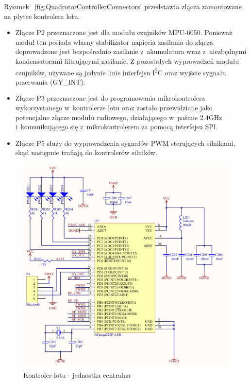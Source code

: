 \documentclass[11pt, twoside]{Thesis} %
\begin{document}
Rysunek ~\ref{fig:QuadrotorControllerConnectors} przedstawia złącza zamontowane na płytce kontrolera lotu. 
\begin{itemize}
	\item Złącze P2 przeznaczone jest dla modułu czujników MPU-6050. Ponieważ moduł ten posiada własny stabilizator napięcia zasilania do złącza doprowadzone jest bezpośrednio zasilanie z~akumulatora wraz z~niezbędnymi kondensatorami filtrującymi zasilanie. Z pozostałych wyprowadzeń modułu czujników, używane są jedynie linie interfejsu I\textsuperscript{2}C oraz wyjście sygnału przerwania (GY\_INT).
	\item Złącze P3 przeznaczone jest do programowania mikrokontrolera wykorzystanego w~kontrolerze lotu oraz zostało przewidziane jako potencjalne złącze modułu radiowego, działającego w~paśmie 2.4GHz i~komunikującego się z~mikrokontrolerem za pomocą interfejsu SPI.  
	\item Złącze P5 służy do wyprowadzenia sygnałów PWM sterujących silnikami, skąd następnie trafiają do kontrolerów silników.
\end{itemize}

\begin{figure}[H]
	\centering
	\includegraphics[scale=0.37]{Pictures/QuadroController_Main_C.png}
		\caption[Kontroler lotu - jednostka centralna]{Kontroler lotu - jednostka centralna}
	\label{fig:QuadrotorControllerMain}
\end{figure}
\end{document}
